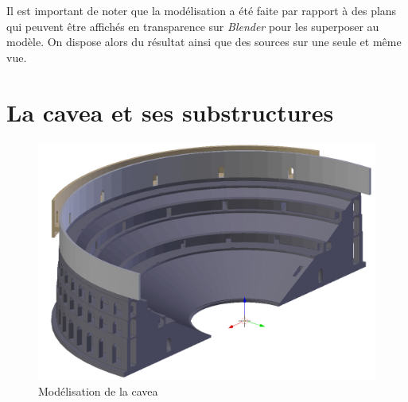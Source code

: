Il est important de noter que la modélisation a été faite par rapport à des plans qui peuvent être affichés en transparence sur \textit{Blender} pour les superposer au modèle. On dispose alors du résultat ainsi que des sources sur une seule et même vue.

\section{La  \gls{cavea} et ses substructures}  
	\label{La cavea et ses substructures}

\begin{figure}[!h]
	\includegraphics[width=\linewidth]{images/modCavea}
	\caption{Modélisation de la \gls{cavea}} 
	\label{modCavea} 
\end{figure} 

